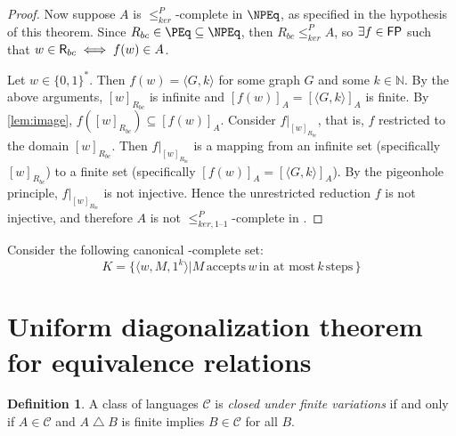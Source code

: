 \documentclass{article}
\theoremstyle{definition} \newtheorem{definition}[definition]{Definition}
\newcommand{\plain}[1]{\,\text{#1}\,} %
\newcommand{\sigmastar}{\{0, 1\}^{*}} %
\newcommand{\kr}{\leq^{P}_{ker}} %
\newcommand{\kri}{\leq^{P}_{ker,1\text{--}1}} %
\newcommand{\symdiff}{\bigtriangleup} %
\newcommand{\defn}[1]{\emph{#1}} %
\newcommand{\pair}[2]{\langle#1,#2\rangle} %
\newcommand{\Pair}[2]{\big\langle#1,#2\big\rangle} %
\newcommand{\triple}[3]{\langle#1,#2,#3\rangle} %
\begin{document}
\begin{proof}
  Now suppose $A$ is $\kr$-complete in $\NPEq$, as specified in the hypothesis
  of this theorem. Since $R_{bc}\in\PEq\subseteq\NPEq$, then $R_{bc}\kr A$, so
  $\exists f\in{\ensuremath{\mathsf{FP}}}$ such that $w\in{\ensuremath{\mathsf{R}}}_{bc}\iff f(w)\in A$.

  Let $w\in\sigmastar$. Then $f(w)=\pair{G}{k}$ for some graph $G$ and some
  $k\in\mathbb{N}$. By the above arguments, $[w]_{R_{bc}}$ is infinite and
  $[f(w)]_A=[\pair{G}{k}]_A$ is finite. By \autoref{lem:image},
  $f([w]_{R_{bc}})\subseteq [f(w)]_A$. Consider $f|_{[w]_{R_{bc}}}$, that is,
  $f$ restricted to the domain $[w]_{R_{bc}}$. Then $f|_{[w]_{R_{bc}}}$ is a
  mapping from an infinite set (specifically $[w]_{R_{bc}}$) to a finite set
  (specifically $[f(w)]_A=[\pair{G}{k}]_A$). By the pigeonhole principle,
  $f|_{[w]_{R_{bc}}}$ is not injective. Hence the unrestricted reduction $f$ is
  not injective, and therefore $A$ is not $\kri$-complete in \NPEq.
\end{proof}

Consider the following canonical \NP-complete set:
\begin{displaymath}
  K=\{\triple{w}{M}{1^k}|M\plain{accepts}w\plain{in at most}k\plain{steps}\}
\end{displaymath}




\section{Uniform diagonalization theorem for equivalence relations}

\begin{definition}
  A class of languages $\mathcal{C}$ is \defn{closed under finite variations}
  if and only if $A\in \mathcal{C}$ and $A\symdiff B$ is finite implies $B\in
  \mathcal{C}$ for all $B$.
\end{definition}
\end{document}
